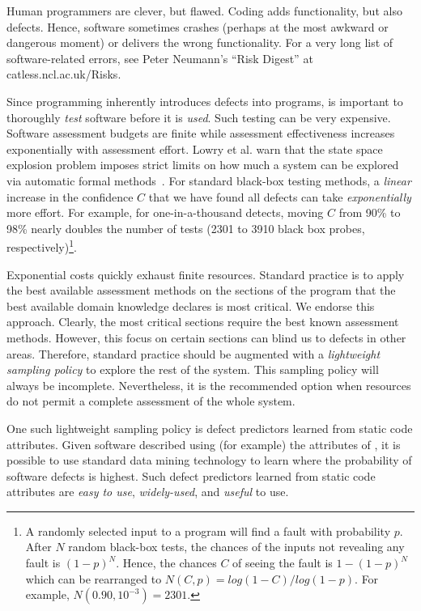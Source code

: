 
Human programmers are clever, but flawed. Coding  adds functionality, but also defects.
Hence, software sometimes crashes (perhaps at the most awkward or dangerous moment) or delivers
the wrong functionality. For a very long list of software-related errors,
see  Peter Neumann's ``Risk Digest'' at catless.ncl.ac.uk/Risks.

Since programming inherently
introduces defects into  programs, is important to thoroughly {\em test} software before it is {\em used}.
Such testing  can be very expensive.
Software assessment budgets are finite
while assessment effectiveness increases 
exponentially with assessment effort.
Lowry et al. warn that  
the state space explosion problem imposes
strict limits on how much a system can be explored
via automatic formal methods~\cite{lowrey98}.
For standard black-box testing methods,
a {\em linear} increase
in the confidence $C$ that we have found all defects
can take {\em exponentially} more effort.
For example, for one-in-a-thousand detects,
moving $C$ from  
90\% to 98\% nearly doubles the number of  tests (2301 to   3910 black box
probes, respectively)\footnote{A randomly selected 
input to a program will find a fault with probability $p$.
After $N$ random black-box tests, the chances of the inputs 
not revealing any fault 
is $(1-p)^N$. Hence, the chances $C$ of seeing the fault is $1-(1-p)^N$
which can be rearranged to 
 $N(C,p)=log(1 -
C)/log(1-p)$. For example, $N(0.90,10^{-3})=2301$.}.

Exponential costs quickly exhaust finite resources.
Standard practice is to apply the best
available assessment methods on the sections of the program that the
best available domain knowledge declares is most critical.  We endorse
this approach.  Clearly, the most critical sections require the best
known assessment methods. However, this focus on certain sections
can blind us to defects in other areas.
Therefore, standard practice should be augmented
with a  {\em
lightweight sampling policy} to explore the rest of the system.  This
sampling policy will always be incomplete.
Nevertheless, it is the recommended option when
resources do not permit a complete assessment of the whole system.

One such lightweight sampling policy is defect predictors learned from static code attributes.
Given software described using (for example) the attributes of , it is possible
to use standard data mining technology to learn where the probability of software defects is highest.
Such defect predictors learned from
static code attributes are   {\em easy to
use}, {\em widely-used}, and {\em useful} to use.

